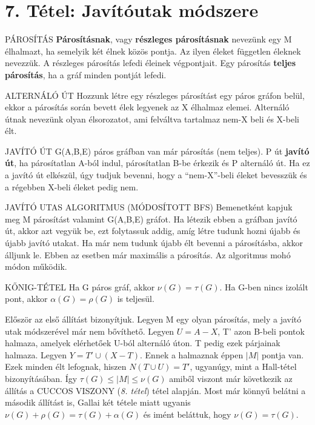 \section{7. Tétel: Javítóutak módszere}

\begin{definicio}{PÁROSÍTÁS}
\textbf{Párosításnak}, vagy \textbf{részleges párosításnak} nevezünk egy M élhalmazt, ha semelyik két élnek közös pontja. Az ilyen éleket független éleknek nevezzük. A részleges párosítás lefedi éleinek végpontjait. Egy párosítás \textbf{teljes párosítás}, ha a gráf minden pontját lefedi.
\end{definicio}

\begin{definicio}{ALTERNÁLÓ ÚT}
Hozzunk létre egy részleges párosítást egy páros gráfon belül, ekkor a párosítás során bevett élek legyenek az X élhalmaz elemei. Alternáló útnak nevezünk olyan élsorozatot, ami felváltva tartalmaz nem-X beli és X-beli élt.
\end{definicio}

\begin{definicio}{JAVÍTÓ ÚT}
G(A,B,E) páros gráfban van már párosítás (nem teljes). P út \textbf{javító út}, ha párosítatlan A-ból indul, párosítatlan B-be érkezik és P alternáló út. Ha ez a javító út elkészül, úgy tudjuk bevenni, hogy a ``nem-X''-beli éleket bevesszük és a régebben X-beli éleket pedig nem.
\end{definicio}

\begin{definicio}{JAVÍTÓ UTAS ALGORITMUS (MÓDOSÍTOTT BFS)}
Bemenetként kapjuk meg M párosítást valamint G(A,B,E) gráfot. Ha létezik ebben a gráfban javító út, akkor azt vegyük be, ezt folytassuk addig, amíg létre tudunk hozni újabb és újabb javító utakat. Ha már nem tudunk újabb élt bevenni a párosításba, akkor álljunk le. Ebben az esetben már maximális a párosítás. Az algoritmus mohó módon működik.
\end{definicio}

\begin{tetel}{KŐNIG-TÉTEL}
Ha G páros gráf, akkor $\nu(G) = \tau(G)$. Ha G-ben nincs izolált pont, akkor $\alpha(G) = \rho(G)$ is teljesül.
\end{tetel}

\begin{bizonyitas}{}
Először az első állítást bizonyítjuk. Legyen M egy olyan párosítás, mely a javító utak módszerével már nem bővíthető. Legyen $U = A - X$, T' azon B-beli pontok halmaza, amelyek elérhetőek U-ból alternáló úton. T pedig ezek párjainak halmaza. Legyen $Y = T' \cup (X - T)$. Ennek a halmaznak éppen $|M|$ pontja van. Ezek minden élt lefognak, hiszen $N(T\cup U) = T'$, ugyanúgy, mint a Hall-tétel bizonyításában. Így $\tau(G) \leq |M| \leq \nu(G)$ amiből viszont már következik az állítás a CUCCOS VISZONY (\textit{8. tétel}) tétel alapján. Most már könnyű belátni a második állítást is, Gallai két tétele miatt ugyanis $\nu(G) + \rho(G) = \tau(G) + \alpha(G)$ és imént beláttuk, hogy $\nu(G) = \tau(G)$.
\end{bizonyitas}

